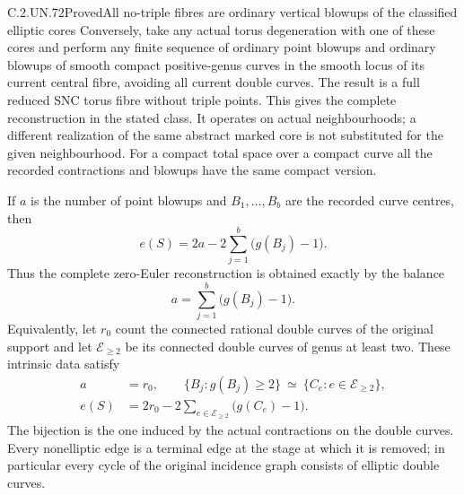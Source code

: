 \begin{statement}{C.2.UN.72}{Proved}{All no-triple fibres are ordinary vertical blowups of the classified elliptic cores}
Conversely, take any actual torus degeneration with one of
these cores and perform any finite sequence of ordinary
point blowups and ordinary blowups of smooth compact
positive-genus curves in the smooth locus of its current
central fibre, avoiding all current double curves. The
result is a full reduced SNC torus fibre without triple
points. This gives the complete reconstruction in the
stated class. It operates on actual neighbourhoods; a
different realization of the same abstract marked core
is not substituted for the given neighbourhood.
For a compact total space over a compact curve all the
recorded contractions and blowups have the same compact
version.

If $a$ is the number of point blowups and $B_1,\ldots,B_b$
are the recorded curve centres, then
\[
                 e(S)=2a-2\sum_{j=1}^b\bigl(g(B_j)-1\bigr).
\tag{C.NT.2}
\]
Thus the complete zero-Euler reconstruction is obtained
exactly by the balance
\[
                       a=\sum_{j=1}^b\bigl(g(B_j)-1\bigr).
\tag{C.NT.3}
\]
Equivalently, let $r_0$ count the connected rational
double curves of the original support and let
$\mathcal E_{\ge2}$ be its connected double curves of
genus at least two. These intrinsic data satisfy
\[
 \begin{split}
 a&=r_0,\qquad
 \{B_j:g(B_j)\ge2\}
       \ \simeq\ \{C_e:e\in\mathcal E_{\ge2}\},\\
 e(S)&=2r_0-2\sum_{e\in\mathcal E_{\ge2}}
                                      \bigl(g(C_e)-1\bigr).
 \end{split}
\tag{C.NT.4}
\]
The bijection is the one induced by the actual contractions
on the double curves. Every nonelliptic edge is a terminal
edge at the stage at which it is removed; in particular
every cycle of the original incidence graph consists of
elliptic double curves.
\end{statement}


